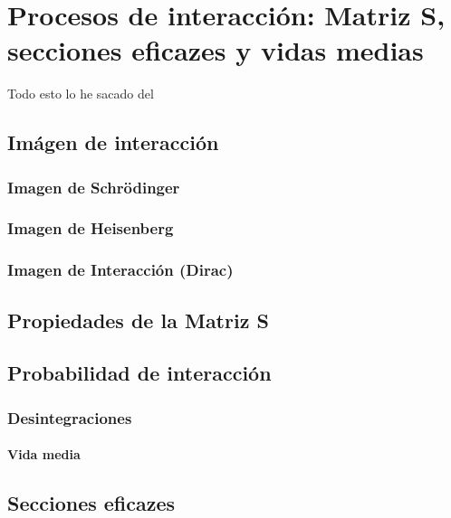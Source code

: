 \setchapterpreamble[u]{\margintoc}
\chapter{Procesos de interacción: Matriz S, secciones eficazes y vidas medias}

\begin{center}
  \large Todo esto lo he sacado del \cite{Dobdado}
\end{center}
\section{Imágen de interacción}
\subsection{Imagen de Schrödinger}
\subsection{Imagen de Heisenberg}
\subsection{Imagen de Interacción (Dirac)}

\section{Propiedades de la Matriz S}

\section{Probabilidad de interacción}

\subsection{Desintegraciones}

\subsubsection{Vida media}

\section{Secciones eficazes}